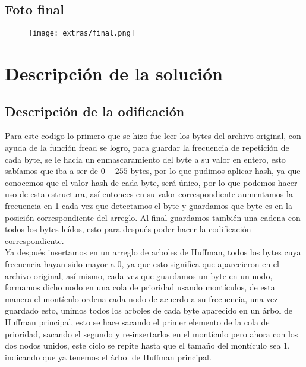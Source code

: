 \documentclass[12 pt]{report}
\begin{document}
\subsection{Foto final}
\begin{figure}[ht]
  \centering
  \texttt{[image: extras/final.png]}
  \caption{\label{fig:Foto final} }
\end{figure}
\newpage



\section{Descripción de la solución}
\subsection{Descripción de la odificación}
Para este codigo lo primero que se hizo fue leer los bytes del archivo original, con ayuda de la función fread se logro, para guardar la frecuencia de repetición de cada byte, se le hacia un enmascaramiento del byte a su valor en entero, esto sabíamos que iba a ser de $0-255$ bytes, por lo que pudimos aplicar hash, ya que conocemos que el valor hash de cada byte, será único, por lo que podemos hacer uso de esta estructura, así entonces en su valor correspondiente aumentamos la frecuencia en 1 cada vez que detectamos el byte y guardamos que byte es en la posición correspondiente del arreglo. Al final guardamos también una cadena con todos los bytes leídos, esto para después poder hacer la codificación correspondiente.\\
Ya después insertamos en un arreglo de arboles de Huffman, todos los bytes cuya frecuencia hayan sido mayor a 0, ya que esto significa que aparecieron en el archivo original, así mismo, cada vez que guardamos un byte en un nodo, formamos dicho nodo en una cola de prioridad usando montículos, de esta manera el montículo ordena cada nodo de acuerdo a su frecuencia, una vez guardado esto, unimos todos los arboles de cada byte aparecido en un árbol de Huffman principal, esto se hace sacando el primer elemento de la cola de prioridad, sacando el segundo y re-insertarlos en el montículo pero ahora con los dos nodos unidos, este ciclo se repite hasta que el tamaño del montículo sea 1, indicando que ya tenemos el árbol de Huffman principal.\\
\end{document}
